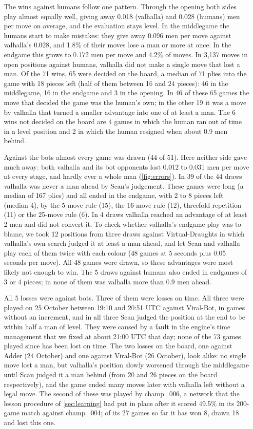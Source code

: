 The wins against humans follow one pattern. Through the
opening both sides play almost equally well, giving away 0.018 (valhalla) and
0.028 (humans) men per move on average, and the evaluation stays level. In the
middlegame the humans start to make mistakes: they give away 0.096 men per move
against valhalla's 0.028, and 1.8\% of their moves lose a man or more at once. In
the endgame this grows to 0.172 men per move and 4.2\% of moves. In 3{,}137
moves in open positions against humans, valhalla did not make a single move that
lost a man. Of the 71 wins, 65 were decided on the board, a median of 71 plies
into the game with 18 pieces left (half of them between 16 and 24 pieces): 46 in
the middlegame, 16 in the endgame and 3 in the opening. In 46 of these 65 games
the move that decided the game was the human's own; in the other 19 it was a move
by valhalla that turned a smaller advantage into one of at least a man. The 6
wins not decided on the board are 4 games in which the human ran out of time in
a level position and 2 in which the human resigned when about 0.9 men behind.

Against the bots almost every game was drawn (44 of 51). Here
neither side gave much away: both valhalla and its bot opponents lost 0.012 to
0.031 men per move at every stage, and hardly ever a whole man
(\cref{fig:errors}). In 39 of the 44 draws valhalla was never a man ahead by
Scan's judgement. These games were long (a median of 167 plies) and all ended in
the endgame, with 2 to 8 pieces left (median 4), by the 5-move rule (15), the
16-move rule (12), threefold repetition (11) or the 25-move rule (6). In 4 draws
valhalla reached an advantage of at least 2 men and did not convert it. To check
whether valhalla's endgame play was to blame, we took 12 positions from three
draws against Virtual-Draughts in which valhalla's own search judged it at least
a man ahead, and let Scan and valhalla play each of them twice with each colour
(48 games at 5 seconds plus 0.05 seconds per move). All 48 games were drawn, so
these advantages were most likely not enough to win. The 5 draws against humans
also ended in endgames of 3 or 4 pieces; in none of them was valhalla more than
0.9 men ahead.

All 5 losses were against bots. Three of them were losses on time. All three
were played on 25 October between 19:10 and 20:51 UTC against Viral-Bot, in
games without an increment, and in all three Scan judged the position at the end
to be within half a man of level. They were caused by a fault in the engine's time
management that we fixed at about 21:00 UTC that day; none of the 73 games
played since has been lost on time. The two losses on the board, one against
Adder (24 October) and one against Viral-Bot (26 October), look alike: no single
move lost a man, but valhalla's position slowly worsened through the middlegame
until Scan judged it a man behind (from 20 and 26 pieces on the board
respectively), and the game ended many moves later with valhalla left without a
legal move. The second of these was played by champ\_006, a network that the
lesson procedure of \cref{sec:learning} had put in place after it scored 49.5\%
in its 200-game match against champ\_004; of its 27 games so far it has won 8,
drawn 18 and lost this one.
